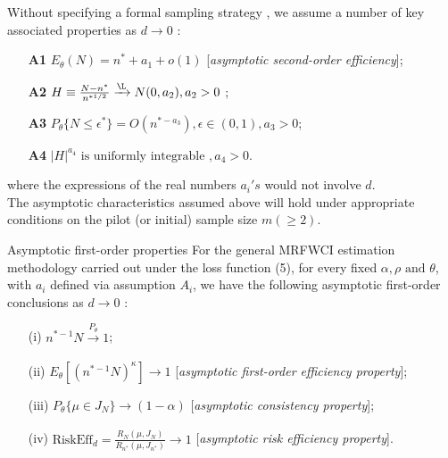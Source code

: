 \documentclass [xcolor=svgnames, t] {beamer}
\begin{document}
\begin{frame}{}
\vspace{15mm}
 Without specifying a formal sampling strategy , we assume a number of key associated properties as $d \xrightarrow{} 0$ :
   
    \begin{itemize}
        \item[\textbf{A1}] $ E_{\theta}(N)=n^* +a_1 +o(1)$ [\textit{asymptotic second-order efficiency}];
         \item[\textbf{A2}] $H \equiv \frac{N-n^*}{n^{*1/2}} \xrightarrow{\L} N(0,a_2), a_2>0$ ;
          \item[\textbf{A3}] $P_{\theta}\{ N \le \epsilon^*\}=O(n^{*-a_3}),\epsilon \in (0,1), a_3>0$;
           \item[\textbf{A4}] $|H|^{a_4} \text{ is uniformly integrable },a_4 >0$.
    \end{itemize}
    
    where the expressions of the real numbers $a_i's$ would not involve $d$.\\
    \vspace{0.2cm}
    The asymptotic characteristics assumed above will hold under appropriate conditions on the pilot (or initial) sample size $m( \geq 2)$.
\end{frame}
\begin{frame}{Asymptotic first-order properties}
\vspace{7mm}
For the general MRFWCI estimation methodology carried out under the loss function (5), for every fixed $\alpha, \rho \text{ and }
 \theta$, with $a_i$ defined via assumption $A_i$, we have the following asymptotic first-order conclusions as $d \xrightarrow{} 0$ :

\begin{itemize}
\item[(i)] $n^{*-1}N \xrightarrow[]{P_{\theta}}1$;
\item[(ii)] $E_{\theta}[(n^{*-1}N)^{\kappa}] \xrightarrow[]{} 1$ [\textit{asymptotic first-order efficiency property}];
\item[(iii)] $P_{\theta} \{ \mu \in J_N\} \xrightarrow[]{} (1-\alpha)$ [\textit{asymptotic consistency property}];
\item[(iv)] $\text{RiskEff}_d =\frac{R_N(\mu,J_N)}{R_{n^*}(\mu,J_{n^*})} \xrightarrow[]{} 1$ [\textit{asymptotic risk efficiency property}].
\end{itemize}
 
\end{frame}
\end{document}
